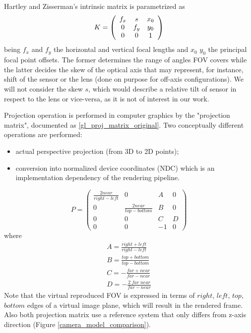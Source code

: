 Hartley and Zisserman's intrinsic matrix \cite{book_cv} is parametrized as
\begin{equation}
	K = \left ( 
    		\begin{array}{ c c c}
    		f_x & s   & x_0 \\
    		0  & f_y & y_0 \\
    		0  & 0   & 1 \\
    		\end{array}
    \right )
\label{hz_intrinsic_matrix_original}
\end{equation}
being $f_{x}$ and $f_{y}$ the horizontal and vertical focal lengths and $x_{0}$ $y_{0}$ the principal focal point offsets. The former determines the range of angles FOV covers while the latter decides the skew of the optical axis that may represent, for instance, shift of the sensor or the lens (done on purpose for off-axis configurations). We will not consider the skew $s$, which would describe a relative tilt of sensor in respect to the lens or vice-versa, as it is not of interest in our work.

Projection operation is performed in computer graphics by the "projection matrix", documented as \ref{gl_proj_matrix_original}. Two conceptually different operations are performed:
\begin{itemize}
\item actual perspective projection (from 3D to 2D points);
\item conversion into normalized device coordinates (NDC) which is an implementation dependency of the rendering pipeline.
\end{itemize}
\begin{equation}
P = \left( \begin{array}{cccc} \frac{2 near}{right - left} & 0 & A & 0 \\ 0 & \frac{2 near}{top - bottom} & B & 0 \\ 0 & 0 & C & D \\ 0 & 0 & -1 & 0 \end{array} \right)
\label{gl_proj_matrix_original}
\end{equation}
where
\begin{equation}
\begin{array}{c}
A = \frac{right + left}{right - left} \\[0.6em]
B = \frac{top + bottom}{top - bottom} \\[0.6em]
C = -\frac{far + near}{far - near}  \\[0.6em]
D = -\frac{2 \; far \; near}{far - near}
\label{gl_proj_matrix_original_details}
\end{array}
\end{equation}
Note that the virtual reproduced FOV is expressed in terms of $right$, $left$, $top$, $bottom$ edges of a virtual image plane, which will result in the rendered frame. Also both projection matrix use a reference system that only differs from z-axis direction (Figure \ref{camera_model_comparison}).

